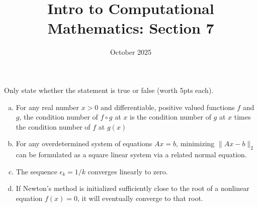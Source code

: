 \documentclass[11pt]{article}
\title{Intro to Computational Mathematics: Section 7}
\date{October 2025}
\newenvironment{problem}[2][Q]{\begin{trivlist}
\item[\hskip \labelsep {\bfseries #1}{\bfseries #2}]}{\end{trivlist}}
\theoremstyle{definition}
\begin{document}
\maketitle

\begin{problem}{1. (True/False, 20pts)}
Only  state whether the statement is true or false (worth 5pts each).
\begin{enumerate}[(a)]
    \item For any real number $x > 0$ and differentiable, positive valued functions $f$ and $g$, the condition number of $f \circ g$ at $x$ is the condition number of $g$ at $x$ times the condition number of $f$ at $g(x)$
    \item For any overdetermined system of equations $Ax = b$, minimizing $\|Ax - b\|_2$ can be formulated as a square linear system via a related normal equation.
    \item The sequence $\epsilon_k = 1/k$ converges linearly to zero.
    \item If Newton's method is initialized sufficiently close to the root of a nonlinear equation $f(x) = 0$, it will eventually converge to that root.
\end{enumerate}
\end{problem}
\end{document}
